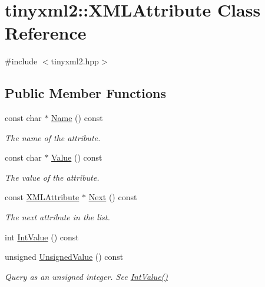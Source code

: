 \hypertarget{classtinyxml2_1_1_x_m_l_attribute}{\section{tinyxml2\-:\-:X\-M\-L\-Attribute Class Reference}
\label{classtinyxml2_1_1_x_m_l_attribute}
}


{\ttfamily \#include $<$tinyxml2.\-hpp$>$}

\subsection*{Public Member Functions}
\begin{DoxyCompactItemize}
\item 
const char $\ast$ \hyperlink{classtinyxml2_1_1_x_m_l_attribute_a631990ac0d176e38fc291b17b295a62d}{Name} () const 
\begin{DoxyCompactList}\small\item\em The name of the attribute. \end{DoxyCompactList}\item 
const char $\ast$ \hyperlink{classtinyxml2_1_1_x_m_l_attribute_adf884db24f469f8a99a14ae786d4ddd7}{Value} () const 
\begin{DoxyCompactList}\small\item\em The value of the attribute. \end{DoxyCompactList}\item 
const \hyperlink{classtinyxml2_1_1_x_m_l_attribute}{X\-M\-L\-Attribute} $\ast$ \hyperlink{classtinyxml2_1_1_x_m_l_attribute_a7fd852d6185af90361ec1bc9a7681ad6}{Next} () const 
\begin{DoxyCompactList}\small\item\em The next attribute in the list. \end{DoxyCompactList}\item 
int \hyperlink{classtinyxml2_1_1_x_m_l_attribute_a949d02a5888092cc68c1e29185301863}{Int\-Value} () const 
\item 
unsigned \hyperlink{classtinyxml2_1_1_x_m_l_attribute_a4c7a179907836a136d1ce5acbe53389d}{Unsigned\-Value} () const 
\begin{DoxyCompactList}\small\item\em Query as an unsigned integer. See \hyperlink{classtinyxml2_1_1_x_m_l_attribute_a949d02a5888092cc68c1e29185301863}{Int\-Value()} \end{DoxyCompactList}\item 

\end{DoxyCompactItemize}
